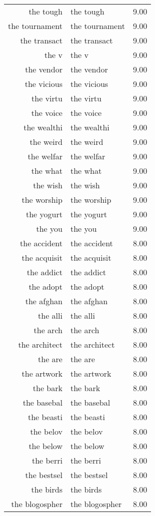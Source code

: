 \begin{table}[ht]
\begin{tabular}{rlr}
  the tough & the tough & 9.00 \\ 
  the tournament & the tournament & 9.00 \\ 
  the transact & the transact & 9.00 \\ 
  the v & the v & 9.00 \\ 
  the vendor & the vendor & 9.00 \\ 
  the vicious & the vicious & 9.00 \\ 
  the virtu & the virtu & 9.00 \\ 
  the voice & the voice & 9.00 \\ 
  the wealthi & the wealthi & 9.00 \\ 
  the weird & the weird & 9.00 \\ 
  the welfar & the welfar & 9.00 \\ 
  the what & the what & 9.00 \\ 
  the wish & the wish & 9.00 \\ 
  the worship & the worship & 9.00 \\ 
  the yogurt & the yogurt & 9.00 \\ 
  the you & the you & 9.00 \\ 
  the accident & the accident & 8.00 \\ 
  the acquisit & the acquisit & 8.00 \\ 
  the addict & the addict & 8.00 \\ 
  the adopt & the adopt & 8.00 \\ 
  the afghan & the afghan & 8.00 \\ 
  the alli & the alli & 8.00 \\ 
  the arch & the arch & 8.00 \\ 
  the architect & the architect & 8.00 \\ 
  the are & the are & 8.00 \\ 
  the artwork & the artwork & 8.00 \\ 
  the bark & the bark & 8.00 \\ 
  the basebal & the basebal & 8.00 \\ 
  the beasti & the beasti & 8.00 \\ 
  the belov & the belov & 8.00 \\ 
  the below & the below & 8.00 \\ 
  the berri & the berri & 8.00 \\ 
  the bestsel & the bestsel & 8.00 \\ 
  the birds & the birds & 8.00 \\ 
  the blogospher & the blogospher & 8.00 \\ 

\end{tabular}
\end{table}
